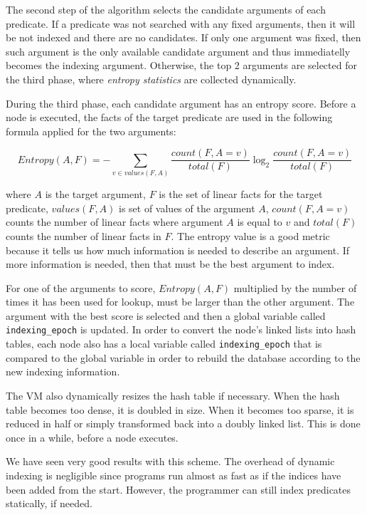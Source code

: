 The second step of the algorithm selects the candidate arguments of each
predicate.  If a predicate was not searched with any fixed arguments, then it
will be not indexed and there are no candidates.  If only one argument was
fixed, then such argument is the only available candidate argument and thus
immediatelly becomes the indexing argument. Otherwise, the top 2 arguments are
selected for the third phase, where \emph{entropy statistics} are collected
dynamically.

During the third phase, each candidate argument has an entropy score.
Before a node is executed, the facts of the target predicate
are used in the following formula applied for the two arguments:

\[
Entropy(A, F) = - \sum_{v \in values(F, A)} \frac{count(F, A = v)}{total(F)} \log_2 \frac{count(F, A = v)}{total(F)}
\]

\noindent where $A$ is the target argument, $F$ is the set of linear facts for
the target predicate, $values(F, A)$ is set of values of the argument $A$,
$count(F, A = v)$ counts the number of linear facts where argument $A$ is equal
to $v$ and $total(F)$ counts the number of linear facts in $F$.  The entropy
value is a good metric because it tells us how much information is needed to
describe an argument. If more information is needed, then that must be the best
argument to index.

For one of the arguments to score, $Entropy(A, F)$ multiplied by the number of
times it has been used for lookup, must be larger than the other argument. The
argument with the best score is selected and then a global variable called
\texttt{indexing\_epoch} is updated. In order to convert the node's linked lists
into hash tables, each node also has a local variable called
\texttt{indexing\_epoch} that is compared to the global variable in order to
rebuild the database according to the new indexing information.

The VM also dynamically resizes the hash table if necessary. When the hash table
becomes too dense, it is doubled in size. When it becomes too sparse, it is
reduced in half or simply transformed back into a doubly linked list. This is
done once in a while, before a node executes.

We have seen very good results with this scheme. The overhead of dynamic
indexing is negligible since programs run almost as fast as if the indices have
been added from the start. However, the programmer can still index predicates
statically, if needed.
